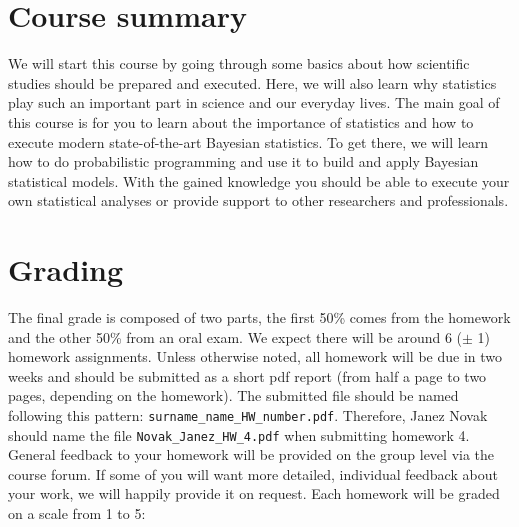 \documentclass[fleqn,moreauthors,10pt]{ds_report}
\begin{document}
\flushbottom

\maketitle

\thispagestyle{empty}



\section*{Course summary}

We will start this course by going through some basics about how scientific studies should be prepared and executed. Here, we will also learn why statistics play such an important part in science and our everyday lives. The main goal of this course is for you to learn about the importance of statistics and how to execute modern state-of-the-art Bayesian statistics. To get there, we will learn how to do probabilistic programming and use it to build and apply Bayesian statistical models. With the gained knowledge you should be able to execute your own statistical analyses or provide support to other researchers and professionals.

\section*{Grading}

The final grade is composed of two parts, the first 50\% comes from the homework and the other 50\% from an oral exam. We expect there will be around 6 ($\pm$ 1) homework assignments. Unless otherwise noted, all homework will be due in two weeks and should be submitted as a short pdf report (from half a page to two pages, depending on the homework). The submitted file should be named following this pattern: \texttt{surname\_name\_HW\_number.pdf}. Therefore, Janez Novak should name the file \texttt{Novak\_Janez\_HW\_4.pdf} when submitting homework 4. General feedback to your homework will be provided on the group level via the course forum. If some of you will want more detailed, individual feedback about your work, we will happily provide it on request. Each homework will be graded on a scale from 1 to 5:
\end{document}
